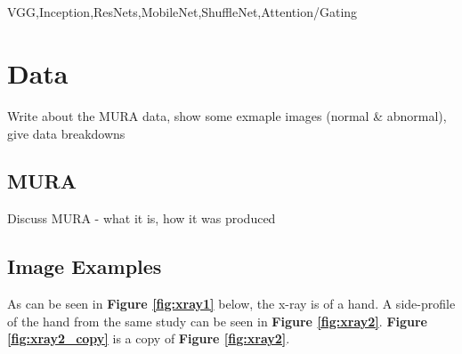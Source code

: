 \documentclass[11pt]{article} %
\theoremstyle{plain}
\theoremstyle{definition}
\begin{document}
\\
\\
\noindent
VGG,Inception,ResNets,MobileNet,ShuffleNet,Attention/Gating




\newpage
\section{Data}
Write about the MURA data, show some exmaple images (normal \& abnormal), give data breakdowns 

\subsection{MURA}
Discuss MURA - what it is, how it was produced

\subsection{Image Examples}
As can be seen in \textbf{Figure \ref{fig:xray1}} below, the x-ray is of a hand. A side-profile of the hand from the same study can be seen in \textbf{Figure \ref{fig:xray2}}. \textbf{Figure \ref{fig:xray2_copy}} is a copy of \textbf{Figure \ref{fig:xray2}}.
\end{document}
